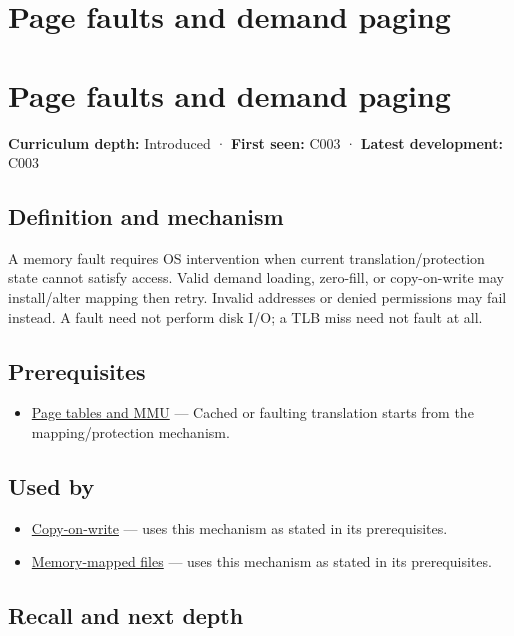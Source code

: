 \hypertarget{appendix-cc0909a7ef14}{}
\section*{Page faults and demand paging}
\section{Page faults and demand paging}\label{page-faults-and-demand-paging}

\textbf{Curriculum depth:} Introduced · \textbf{First seen:} C003 · \textbf{Latest development:} C003

\subsection{Definition and mechanism}\label{definition-and-mechanism}

A memory fault requires OS intervention when current translation/protection state cannot satisfy access. Valid demand loading, zero-fill, or copy-on-write may install/alter mapping then retry. Invalid addresses or denied permissions may fail instead. A fault need not perform disk I/O; a TLB miss need not fault at all.

\subsection{Prerequisites}\label{prerequisites}

\begin{itemize}
\tightlist
\item
  \hyperref[appendix-01e5905165c4]{Page tables and MMU} --- Cached or faulting translation starts from the mapping/protection mechanism.
\end{itemize}

\subsection{Used by}\label{used-by}

\begin{itemize}
\tightlist
\item
  \hyperref[appendix-7a06e5baac04]{Copy-on-write} --- uses this mechanism as stated in its prerequisites.
\item
  \hyperref[appendix-313ee7a0ba7b]{Memory-mapped files} --- uses this mechanism as stated in its prerequisites.
\end{itemize}

\subsection{Recall and next depth}\label{recall-and-next-depth}

